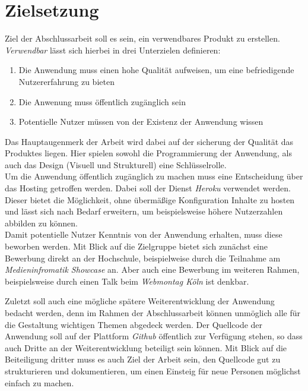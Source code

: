 \section{Zielsetzung}
Ziel der Abschlussarbeit soll es sein, ein verwendbares Produkt zu erstellen. \textit{Verwendbar} lässt sich hierbei in drei Unterzielen definieren:

\begin{enumerate}
  \item Die Anwendung muss einen hohe Qualität aufweisen, um eine befriedigende Nutzererfahrung zu bieten
  \item Die Anwenung muss öffentlich zugänglich sein
  \item Potentielle Nutzer müssen von der Existenz der Anwendung wissen
\end{enumerate}

Das Hauptaugenmerk der Arbeit wird dabei auf der sicherung der Qualität das Produktes liegen. Hier spielen sowohl die Programmierung der Anwendung, als auch das Design (Visuell und Strukturell) eine Schlüsselrolle. \\
Um die Anwendung öffentlich zugänglich zu machen muss eine Entscheidung über das Hosting getroffen werden. Dabei soll der Dienst \textit{Heroku} verwendet werden. Dieser bietet die Möglichkeit, ohne übermäßige Konfiguration Inhalte zu hosten und lässt sich nach Bedarf erweitern, um beispielsweise höhere Nutzerzahlen abbilden zu können. \\
Damit potentielle Nutzer Kenntnis von der Anwendung erhalten, muss diese beworben werden. Mit Blick auf die Zielgruppe bietet sich zunächst eine Bewerbung direkt an der Hochschule, beispielweise durch die Teilnahme am \textit{Medieninfromatik Showcase} an. Aber auch eine Bewerbung im weiteren Rahmen, beispielsweise durch einen Talk beim \textit{Webmontag Köln} ist denkbar.

Zuletzt soll auch eine mögliche spätere Weiterentwicklung der Anwendung bedacht werden, denn im Rahmen der Abschlussarbeit können unmöglich alle für die Gestaltung wichtigen Themen abgedeck werden. Der Quellcode der Anwendung soll auf der Plattform \textit{Github} öffentlich zur Verfügung stehen, so dass auch Dritte an der Weiterentwicklung beteiligt sein können. Mit Blick auf die Beiteiligung dritter muss es auch Ziel der Arbeit sein, den Quellcode gut zu strukturieren und dokumentieren, um einen Einsteig für neue Personen möglichst einfach zu machen.

